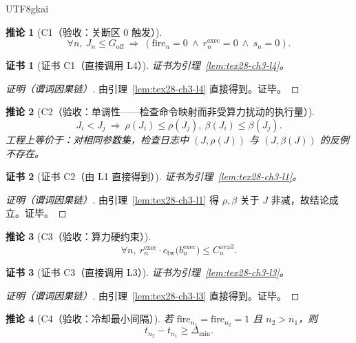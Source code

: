 \documentclass[12pt]{article}
\newtheorem{corollary}{推论}[section]
\newtheorem{Certificate}{证书}[section]
\begin{document}
\begin{CJK*}{UTF8}{gkai}
\begin{corollary}[C1（验收：关断区 0 触发）]
\label{cor:tex28-ch3-c1}
\[
  \forall n,\ J_n\le G_{\mathrm{off}}\ \Rightarrow\ (\mathrm{fire}_n=0\ \wedge\ r^{\mathrm{exec}}_n=0\ \wedge\ s_n=0).
\]
\end{corollary}

\begin{Certificate}[证书 C1（直接调用 L4）]
\label{cert:tex28-ch3-c1}
证书为引理~\ref{lem:tex28-ch3-l4}。
\end{Certificate}

\begin{proof}[证明（谓词因果链）]
由引理~\ref{lem:tex28-ch3-l4} 直接得到。证毕。
\end{proof}

\begin{corollary}[C2（验收：单调性——检查命令映射而非受算力扰动的执行量）]
\label{cor:tex28-ch3-c2}
\[
  J_i<J_j\ \Rightarrow\ \rho(J_i)\le\rho(J_j),\ \beta(J_i)\le\beta(J_j).
\]
工程上等价于：对相同参数集，检查日志中 $(J,\rho(J))$ 与 $(J,\beta(J))$ 的反例不存在。
\end{corollary}

\begin{Certificate}[证书 C2（由 L1 直接得到）]
\label{cert:tex28-ch3-c2}
证书为引理~\ref{lem:tex28-ch3-l1}。
\end{Certificate}

\begin{proof}[证明（谓词因果链）]
由引理~\ref{lem:tex28-ch3-l1} 得 $\rho,\beta$ 关于 $J$ 非减，故结论成立。证毕。
\end{proof}

\begin{corollary}[C3（验收：算力硬约束）]
\label{cor:tex28-ch3-c3}
\[
  \forall n,\ r^{\mathrm{exec}}_n\cdot c_{\mathrm{tw}}\!\bigl(b^{\mathrm{exec}}_n\bigr)\le C^{\mathrm{avail}}_n.
\]
\end{corollary}

\begin{Certificate}[证书 C3（直接调用 L3）]
\label{cert:tex28-ch3-c3}
证书为引理~\ref{lem:tex28-ch3-l3}。
\end{Certificate}

\begin{proof}[证明（谓词因果链）]
由引理~\ref{lem:tex28-ch3-l3} 直接得到。证毕。
\end{proof}

\begin{corollary}[C4（验收：冷却最小间隔）]
\label{cor:tex28-ch3-c4}
若 $\mathrm{fire}_{n_1}=\mathrm{fire}_{n_2}=1$ 且 $n_2>n_1$，则
\[
  t_{n_2}-t_{n_1}\ge \Delta_{\min}.
\]
\end{corollary}


\end{CJK*}
\end{document}
